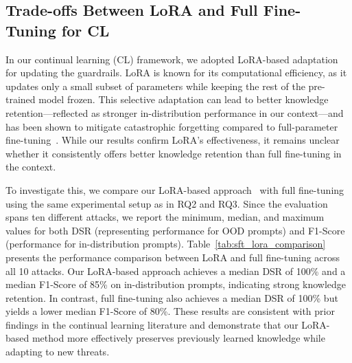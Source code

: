 \subsection{Trade-offs Between LoRA and Full Fine-Tuning for CL}
In our continual learning (CL) framework, we adopted LoRA-based adaptation for updating the guardrails.
LoRA is known for its computational efficiency, as it updates only a small subset of parameters while keeping the rest of the pre-trained model frozen. This selective adaptation can lead to better knowledge retention—reflected as stronger in-distribution performance in our context—and has been shown to mitigate catastrophic forgetting compared to full-parameter fine-tuning~\cite{hu2022lora,he2022towards}. While our results confirm LoRA's effectiveness, it remains unclear whether it consistently offers better knowledge retention than full fine-tuning in the context.


To investigate this, we compare our LoRA-based approach~\cite{hu2022lora} with full fine-tuning~\cite{howard2018universal} using the same experimental setup as in RQ2 and RQ3. Since the evaluation spans ten different attacks, we report the minimum, median, and maximum values for both DSR (representing performance for OOD prompts) and F1-Score (performance for in-distribution prompts).
%
Table~\ref{tab:sft_lora_comparison} presents the performance comparison between LoRA and full fine-tuning across all 10 attacks. Our LoRA-based approach achieves a median DSR of 100\% and a median F1-Score of 85\% on in-distribution prompts, indicating strong knowledge retention. In contrast, full fine-tuning also achieves a median DSR of 100\% but yields a lower median F1-Score of 80\%. These results are consistent with prior findings in the continual learning literature and demonstrate that our LoRA-based method more effectively preserves previously learned knowledge while adapting to new threats.


